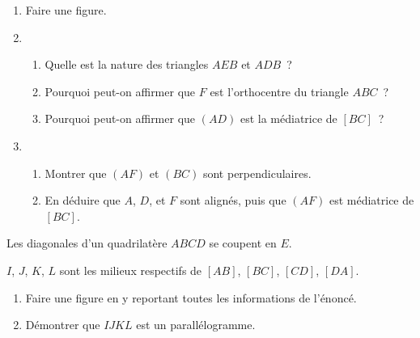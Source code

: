 \begin{enumerate}
	\item Faire une figure.
	\item	\begin{enumerate} 
				\item Quelle est la nature des triangles $AEB$ et $ADB$~?
				\item Pourquoi peut-on affirmer que $F$ est l’orthocentre du triangle $ABC$~?
				\item Pourquoi peut-on affirmer que $(AD)$ est la médiatrice de $[BC]$~?
			\end{enumerate}
	\item	\begin{enumerate} 
				\item Montrer que $(AF)$ et $(BC)$ sont perpendiculaires.
				\item En déduire que $A$, $D$, et $F$ sont alignés, puis que $(AF)$ est médiatrice de $[BC]$.
			\end{enumerate}
\end{enumerate}

\exercice

Les diagonales d’un quadrilatère $ABCD$ se coupent en $E$.

$I$, $J$, $K$, $L$ sont les milieux respectifs de $[AB]$, $[BC]$, $[CD]$, $[DA]$.

\begin{enumerate}
	\item Faire une figure en y reportant toutes les informations de l’énoncé.
	\item Démontrer que $IJKL$ est un parallélogramme.
\end{enumerate}